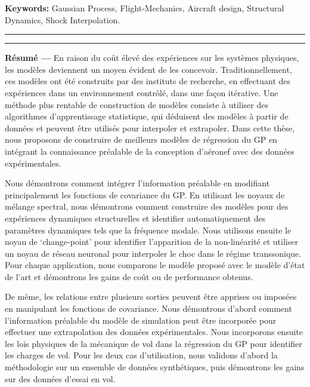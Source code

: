 {\large\textbf{Keywords:}}
    Gaussian Process, Flight-Mechanics, Aircraft design, Structural Dynamics, Shock Interpolation.
\\
\noindent\rule[2pt]{\textwidth}{0.5pt}

\pagebreak

\noindent\rule[2pt]{\textwidth}{0.5pt}

{\large\textbf{Résumé ---}}
En raison du coût élevé des expériences sur les systèmes physiques, les modèles deviennent un moyen évident de les concevoir. Traditionnellement, ces modèles ont été construits par des instituts de recherche, en effectuant des expériences dans un environnement contrôlé, dans une façon itérative. Une méthode plus rentable de construction de modèles consiste à utiliser des algorithmes d'apprentissage statistique, qui déduisent des modèles à partir de données et peuvent être utilisés pour interpoler et extrapoler. Dans cette thèse, nous proposons de construire de meilleurs modèles de régression du GP en intégrant la connaissance préalable de la conception d'aéronef avec des données expérimentales.

Nous démontrons comment intégrer l'information préalable en modifiant principalement les fonctions de covariance du GP. En utilisant les noyaux de mélange spectral, nous démontrons comment construire des modèles pour des expériences dynamiques structurelles et identifier automatiquement des paramètres dynamiques tels que la fréquence modale. Nous utilisons ensuite le noyau de `change-point' pour identifier l'apparition de la non-linéarité et utiliser un noyau de réseau neuronal pour interpoler le choc dans le régime transsonique. Pour chaque application, nous comparons le modèle proposé avec le modèle d'état de l'art et démontrons les gains de coût ou de performance obtenus.


De même, les relations entre plusieurs sorties peuvent être apprises ou imposées en manipulant les fonctions de covariance. Nous démontrons d'abord comment l'information préalable du modèle de simulation peut être incorporée pour effectuer une extrapolation des données expérimentales. Nous incorporons ensuite les lois physiques de la mécanique de vol dans la régression du GP pour identifier les charges de vol. Pour les deux cas d'utilisation, nous validons d'abord la méthodologie sur un ensemble de données synthétiques, puis démontrons les gains sur des données d'essai en vol.

